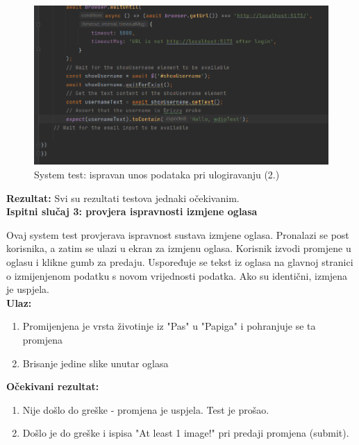 			\begin{figure}[H]
				\includegraphics[scale=0.7]{slike/syslogin2.PNG} 
				\centering
				\caption{System test: ispravan unos podataka pri ulogiravanju (2.)}
				\label{syslogin2}
			\end{figure}
			
			\textbf{Rezultat:}
			Svi su rezultati testova jednaki očekivanim.\\
			
			\textbf{Ispitni slučaj 3: provjera ispravnosti izmjene oglasa}
			
			Ovaj system test provjerava ispravnost sustava izmjene oglasa. Pronalazi se post korisnika, a zatim se ulazi u ekran za izmjenu oglasa. Korisnik izvodi promjene u oglasu i klikne gumb za predaju. Uspoređuje se tekst iz oglasa na glavnoj stranici o izmijenjenom podatku s novom vrijednosti podatka. Ako su identični, izmjena je uspjela. \\
			
			\textbf{Ulaz:}
			
				\begin{enumerate}
					\item Promijenjena je vrsta životinje iz "Pas" u "Papiga" i pohranjuje se ta promjena
					\item Brisanje jedine slike unutar oglasa
				\end{enumerate}
				
			\textbf{Očekivani rezultat:}
			
				\begin{enumerate}
					\item Nije došlo do greške - promjena je uspjela. Test je prošao.
					\item Došlo je do greške i ispisa "At least 1 image!" pri predaji promjena (submit).
				\end{enumerate}
			
